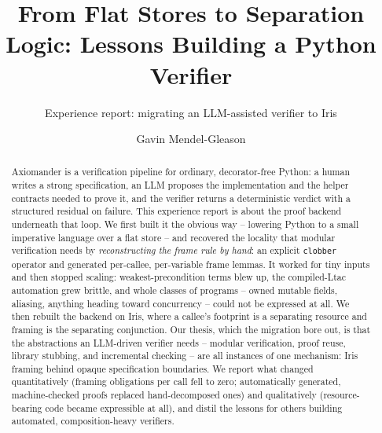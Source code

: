 \documentclass[sigconf,nonacm]{acmart}
\newcommand{\code}[1]{\texttt{#1}}
\begin{document}
\title{From Flat Stores to Separation Logic:
Lessons Building a Python Verifier}
\subtitle{Experience report: migrating an LLM-assisted verifier to Iris}

\author{Gavin Mendel-Gleason}
\email{}

\renewcommand{\shortauthors}{Mendel-Gleason}

\begin{abstract}
Axiomander is a verification pipeline for ordinary, decorator-free Python: a
human writes a strong specification, an LLM proposes the implementation and the
helper contracts needed to prove it, and the verifier returns a deterministic
verdict with a structured residual on failure. This experience report is about
the proof backend underneath that loop. We first built it the obvious way --
lowering Python to a small imperative language over a flat store -- and recovered
the locality that modular verification needs by \emph{reconstructing the frame
rule by hand}: an explicit \code{clobber} operator and generated per-callee,
per-variable frame lemmas. It worked for tiny inputs and then stopped scaling:
weakest-precondition terms blew up, the compiled-Ltac automation grew brittle,
and whole classes of programs -- owned mutable fields, aliasing, anything heading
toward concurrency -- could not be expressed at all. We then rebuilt the backend
on Iris, where a callee's footprint is a separating resource and framing is the
separating conjunction. Our thesis, which the migration bore out, is that the
abstractions an LLM-driven verifier needs -- modular verification, proof reuse,
library stubbing, and incremental checking -- are all instances of one mechanism:
Iris framing behind opaque specification boundaries. We report what changed
quantitatively (framing obligations per call fell to zero; automatically
generated, machine-checked proofs replaced hand-decomposed ones) and
qualitatively (resource-bearing code became expressible at all), and distil the
lessons for others building automated, composition-heavy verifiers.
\end{abstract}


\maketitle
\end{document}
